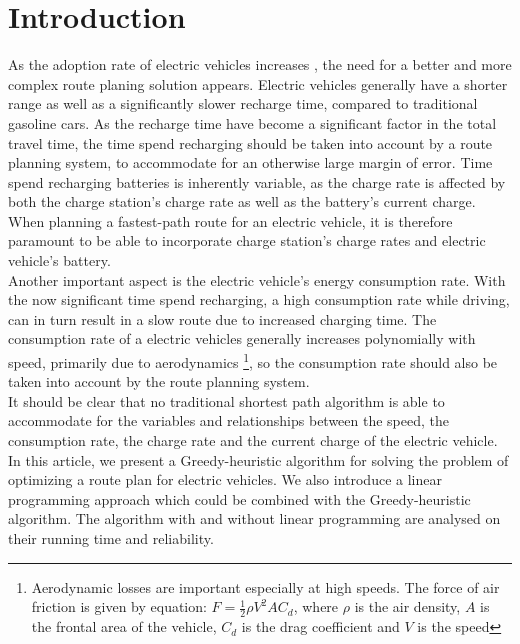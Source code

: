 \section{Introduction}

As the adoption rate of electric vehicles increases \cite{ev-sales-increasing}, the need for a better and more complex route planing solution appears. Electric vehicles generally have a shorter range as well as a significantly slower recharge time, compared to traditional gasoline cars. As the recharge time have become a significant factor in the total travel time, the time spend recharging should be taken into account by a route planning system, to accommodate for an otherwise large margin of error. Time spend recharging batteries is inherently variable, as the charge rate is affected by both the charge station's charge rate as well as the battery's current charge. When planning a fastest-path route for an electric vehicle, it is therefore paramount to be able to incorporate charge station's charge rates and electric vehicle's battery.\\

Another important aspect is the electric vehicle's energy consumption rate. With the now significant time spend recharging, a high consumption rate while driving, can in turn result in a slow route due to increased charging time. The consumption rate of a electric vehicles generally increases polynomially with speed, primarily due to aerodynamics \footnote{Aerodynamic losses are important especially at high speeds. The force of air friction is given by equation: $F = \frac{1}{2} \rho V^2 A C_d$, where $\rho$ is the air density, $A$ is the frontal area of the vehicle, $C_d$ is the drag coefficient and $V$ is the speed}, so the consumption rate should also be taken into account by the route planning system.\\

It should be clear that no traditional shortest path algorithm is able to accommodate for the variables and relationships between the speed, the consumption rate, the charge rate and the current charge of the electric vehicle. In this article, we present a Greedy-heuristic algorithm for solving the problem of optimizing a route plan for electric vehicles. We also introduce a linear programming approach which could be combined with the Greedy-heuristic algorithm. The algorithm with and without linear programming are analysed on their running time and reliability.




